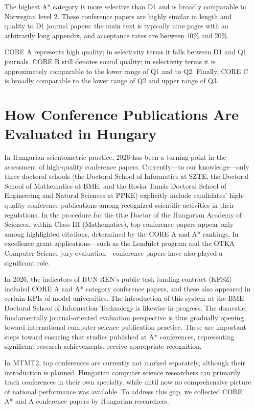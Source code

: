\documentclass[12pt,a4paper]{article}
\begin{document}
The highest A\!* category is more selective than D1 and is broadly comparable to Norwegian level 2. These conference papers are highly similar in length and quality to D1 journal papers: the main text is typically nine pages with an arbitrarily long appendix, and acceptance rates are between 10\% and 20\%.

CORE A represents high quality; in selectivity terms it falls between D1 and Q1 journals. CORE B still denotes sound quality; in selectivity terms it is approximately comparable to the lower range of Q1 and to Q2. Finally, CORE C is broadly comparable to the lower range of Q2 and upper range of Q3.

\section{How Conference Publications Are Evaluated in Hungary}

In Hungarian scientometric practice, 2026 has been a turning point in the assessment of high-quality conference papers. Currently—to our knowledge—only three doctoral schools (the Doctoral School of Informatics at SZTE, the Doctoral School of Mathematics at BME, and the Roska Tamás Doctoral School of Engineering and Natural Sciences at PPKE) explicitly include candidates' high-quality conference publications among recognized scientific activities in their regulations. In the procedure for the title Doctor of the Hungarian Academy of Sciences, within Class III (Mathematics), top conference papers appear only among highlighted citations, determined by the CORE A and A\!* rankings. In excellence grant applications—such as the Lendület program and the OTKA Computer Science jury evaluation—conference papers have also played a significant role.

In 2026, the indicators of HUN-REN's public task funding contract (KFSZ) included CORE A and A\!* category conference papers, and these also appeared in certain KPIs of model universities. The introduction of this system at the BME Doctoral School of Information Technology is likewise in progress. The domestic, fundamentally journal-oriented evaluation perspective is thus gradually opening toward international computer science publication practice. These are important steps toward ensuring that studies published at A\!* conferences, representing significant research achievements, receive appropriate recognition.

In MTMT2, top conferences are currently not marked separately, although their introduction is planned. Hungarian computer science researchers can primarily track conferences in their own specialty, while until now no comprehensive picture of national performance was available. To address this gap, we collected CORE A\!* and A conference papers by Hungarian researchers.
\end{document}

